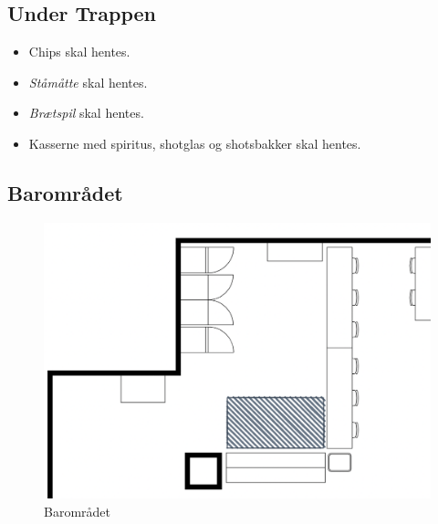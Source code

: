 \subsection{Under Trappen}
\label{sec:pre:under-trappen}

\begin{itemize}
	\item Chips skal hentes.
	\item \textit{Ståmåtte} skal hentes.
	\item \textit{Brætspil} skal hentes.
	\item Kasserne med spiritus, shotglas og shotsbakker skal hentes.
\end{itemize}

\subsection{Barområdet}
\label{sec:pre:baromradet}

\begin{figure}[H]
	\centering
	\includegraphics[width=\linewidth]{billeder/baromraadet.png}
	\caption{Barområdet}
	\label{fig:baromraadet}
\end{figure}

